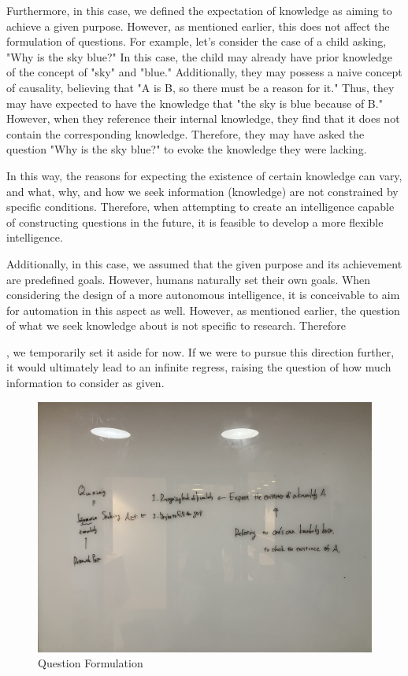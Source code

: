 \documentclass{book}
\begin{document}
Furthermore, in this case, we defined the expectation of knowledge as aiming to achieve a given purpose. However, as mentioned earlier, this does not affect the formulation of questions. For example, let's consider the case of a child asking, "Why is the sky blue?" In this case, the child may already have prior knowledge of the concept of "sky" and "blue." Additionally, they may possess a naive concept of causality, believing that "A is B, so there must be a reason for it." Thus, they may have expected to have the knowledge that "the sky is blue because of B." However, when they reference their internal knowledge, they find that it does not contain the corresponding knowledge. Therefore, they may have asked the question "Why is the sky blue?" to evoke the knowledge they were lacking.

In this way, the reasons for expecting the existence of certain knowledge can vary, and what, why, and how we seek information (knowledge) are not constrained by specific conditions. Therefore, when attempting to create an intelligence capable of constructing questions in the future, it is feasible to develop a more flexible intelligence.

Additionally, in this case, we assumed that the given purpose and its achievement are predefined goals. However, humans naturally set their own goals. When considering the design of a more autonomous intelligence, it is conceivable to aim for automation in this aspect as well. However, as mentioned earlier, the question of what we seek knowledge about is not specific to research. Therefore

, we temporarily set it aside for now. If we were to pursue this direction further, it would ultimately lead to an infinite regress, raising the question of how much information to consider as given.

\begin{figure}[htb]
    \centering
    \includegraphics[width=\textwidth]{figs/question_formulation.jpg}
    \caption{Question Formulation}
    \label{fig:enter-label}
\end{figure}
\end{document}
